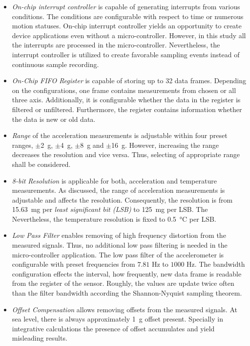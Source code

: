 \documentclass[english,12pt,a4paper,pdftex,elec,utf8]{aaltothesis}
\begin{document}
\begin{itemize}
\item \textit{On-chip interrupt controller} is capable of generating  interrupts from various conditions. The conditions are configurable with respect to time or numerous motion statuses. On-chip interrupt controller yields an opportunity to create device applications even without a micro-controller. However, in this study all the interrupts are processed in the micro-controller. Nevertheless, the interrupt controller is utilized to create favorable sampling events instead of continuous sample recording.

\item \textit{On-Chip FIFO Register} is capable of storing up to 32 data frames. Depending on the configurations, one frame contains measurements from chosen or all three axis. Additionally, it is configurable whether the data in the register is filtered or unfiltered. Furthermore, the register contains information whether the data is new or old data.

\item \textit{Range} of the acceleration measurements is adjustable within four preset ranges,  $\pm$\SI{2}{\gram}, $\pm$\SI{4}{\gram}, $\pm$\SI{8}{\gram} and $\pm$\SI{16}{\gram}. However, increasing the range decreases the resolution and vice versa. Thus, selecting of appropriate range shall be considered.

\item \textit{8-bit Resolution} is applicable for both, acceleration and temperature measurements. As discussed, the range of acceleration measurements is adjustable and affects the resolution. Consequently, the resolution is from \SI{15.63}{\milli\gram} per \textit{least significant bit (LSB)} to \SI{125}{\milli\gram} per LSB. The  Nevertheless, the temperature resolution is fixed to \SI{0.5}{\celsius} per LSB.

\item \textit{Low Pass Filter} enables removing of high frequency distortion from the measured signals. Thus, no additional low pass filtering is needed in the micro-controller application. The low pass filter of the accelerometer is configurable with preset frequencies from $7.81$ Hz to $1000$ Hz. The bandwidth configuration effects the interval, how frequently, new data frame is readable from the register of the sensor. Roughly, the values are update twice often than the filter bandwidth according the Shannon-Nyquist sampling theorem.

\item \textit{Offset Compensation} allows removing offsets from the measured signals. At sea level, there is always approximately \SI{1}{\gram} offset present. Specially in integrative calculations the presence of offset accumulates and yield misleading results.



\end{itemize}
\end{document}
